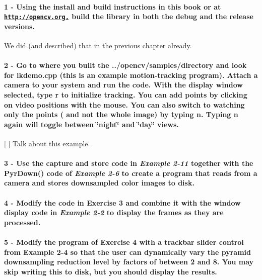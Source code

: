 \paragraph*{1 -\/ Using the install and build instructions in this book or at \href{http://opencv.org,}{\tt http\+://opencv.\+org,} build the library in both the debug and the release versions.}

We did (and described) that in the previous chapter already.

\paragraph*{2 -\/ Go to where you built the {\ttfamily ../opencv/samples/directory} and look for {\ttfamily lkdemo.\+cpp} (this is an example motion-\/tracking program). Attach a camera to your system and run the code. With the display window selected, type {\bfseries r} to initialize tracking. You can add points by clicking on video positions with the mouse. You can also switch to watching only the points ( and not the whole image) by typing {\bfseries n}. Typing {\bfseries n} again will toggle between \char`\"{}night\char`\"{} and \char`\"{}day\char`\"{} views.}


\begin{DoxyItemize}
\item \mbox{[} \mbox{]} Talk about this example.
\end{DoxyItemize}

\paragraph*{3 -\/ Use the capture and store code in {\itshape Example 2-\/11} together with the {\ttfamily Pyr\+Down()} code of {\itshape Example 2-\/6} to create a program that reads from a camera and stores downsampled color images to disk.}

\paragraph*{4 -\/ Modify the code in Exercise 3 and combine it with the window display code in {\itshape Example 2-\/2} to display the frames as they are processed.}

\paragraph*{5 -\/ Modify the program of Exercise 4 with a trackbar slider control from Example 2-\/4 so that the user can dynamically vary the pyramid downsampling reduction level by factors of between 2 and 8. You may skip writing this to disk, but you should display the results.}


